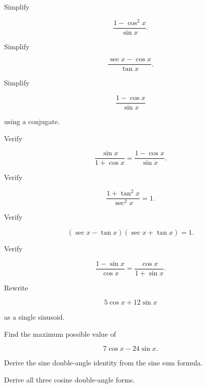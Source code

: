 \begin{exercise}[2]
Simplify

\[
\frac{
1-\cos^2x
}{
\sin x
}.
\]
\end{exercise}

\begin{exercise}[2]
Simplify

\[
\frac{
\sec x-\cos x
}{
\tan x
}.
\]
\end{exercise}

\begin{exercise}[2]
Simplify

\[
\frac{
1-\cos x
}{
\sin x
}
\]

using a conjugate.
\end{exercise}

\begin{exercise}[3]
Verify

\[
\frac{
\sin x
}{
1+\cos x
}
=
\frac{
1-\cos x
}{
\sin x
}.
\]
\end{exercise}

\begin{exercise}[3]
Verify

\[
\frac{
1+\tan^2x
}{
\sec^2x
}
=
1.
\]
\end{exercise}

\begin{exercise}[3]
Verify

\[
(\sec x-\tan x)
(\sec x+\tan x)
=
1.
\]
\end{exercise}

\begin{exercise}[3]
Verify

\[
\frac{
1-\sin x
}{
\cos x
}
=
\frac{
\cos x
}{
1+\sin x
}.
\]
\end{exercise}

\begin{exercise}[3]
Rewrite

\[
5\cos x+12\sin x
\]

as a single sinusoid.
\end{exercise}

\begin{exercise}[3]
Find the maximum possible value of

\[
7\cos x-24\sin x.
\]
\end{exercise}

\begin{exercise}[3]
Derive the sine double-angle identity from the sine sum formula.
\end{exercise}

\begin{exercise}[3]
Derive all three cosine double-angle forms.
\end{exercise}

